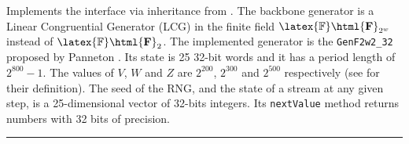 
Implements the  interface via inheritance
from . The backbone generator is a Linear Congruential
Generator (LCG) in the finite field
 $\latex{\mathbb{F}}\html{\mathbf{F}}_{2^w}$ instead of
 $\latex{\mathbb{F}}\html{\mathbf{F}}_2$.
The implemented generator is the \texttt{GenF2w2\_32} proposed by
Panneton \cite{rPAN04a,rPAN04t}.  Its state is 25 32-bit words and it has
a period length of $2^{800} - 1$.
The values of $V$, $W$ and $Z$ are $2^{200}$, $2^{300}$ and $2^{500}$
respectively (see  for their definition). The seed of the
RNG, and the state of a stream at any given step, is a 25-dimensional vector
of 32-bits integers.
Its \texttt{nextValue} method returns numbers with 32 bits of precision.

\bigskip\hrule


